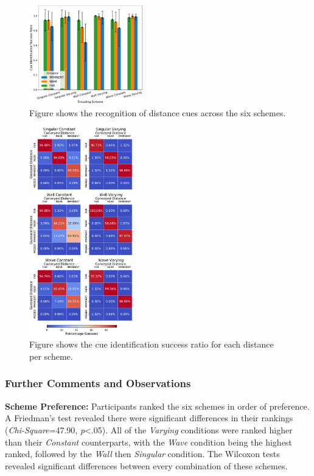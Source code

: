 \documentclass{mpaper}
\begin{document}
\begin{figure}[h]
    \centering
    \includegraphics[width=0.44\textwidth]{dissertation/images/Mean Correct by Encoding Scheme.pdf}
    \caption{Figure shows the recognition of distance cues across the six schemes.}
    \label{fig:mean-correct}
\end{figure}

\begin{figure}[h]
    \centering
    \includegraphics[width=0.40\textwidth]{dissertation/images/heatmaps.pdf}
    \caption{Figure shows the cue identification success ratio for each distance per scheme.}
    \label{fig:heatmaps}
\end{figure}




\subsubsection{Further Comments and Observations}
\textbf{Scheme Preference:}
Participants ranked the six schemes in order of preference. A Friedman's test revealed there were significant differences in their rankings (\textit{Chi-Square}=47.90, \textit{p}<.05). All of the \textit{Varying} conditions were ranked higher than their \textit{Constant} counterparts, with the \textit{Wave} condition being the highest ranked, followed by the \textit{Wall} then \textit{Singular} condition. The Wilcoxon tests revealed significant differences between every combination of these schemes.
\end{document}
